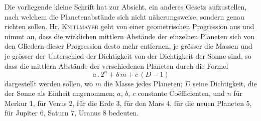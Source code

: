 Die vorliegende kleine Schrift hat zur Absicht, ein anderes Gesetz aufzustellen, nach welchem die Planetenabstände sich nicht näherungsweise, sondern genau richten sollen. Hr. \textsc{Knitlmayer} geht von einer geometrischen Progression aus und nimmt an, dass die wirklichen mittlern Abstände der einzelnen Planeten sich von den Gliedern dieser Progression desto mehr entfernen, je grösser die Massen und je grösser der Unterschied der Dichtigkeit von der Dichtigkeit der Sonne sind, so dass die mittlern Abstände der verschiedenen Planeten durch die Formel
\[ a \,.\, 2^n + b\,m + c\,(D - \mathrm{1}) \]
dargestellt werden sollen, wo $m$ die Masse jedes Planeten; $D$ seine Dichtigkeit, die der Sonne als Einheit angenommen; $a$, $b$, $c$ constante Coëfficienten, und $n$ für Merkur 1, für Venus 2, für die Erde 3, für den Mars 4, für die neuen Planeten 5, für Jupiter 6, Saturn 7, Uranus 8 bedeuten.

